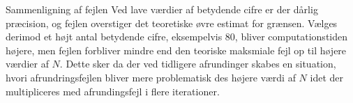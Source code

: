 
\begin{frame}{Sammenligning af fejlen}
    Ved lave værdier af betydende cifre er der dårlig præcision, og fejlen overstiger det teoretiske øvre estimat for grænsen. 
    Vælges derimod et højt antal betydende cifre, eksempelvis $80$, bliver computationstiden højere, men fejlen forbliver mindre end den teoriske maksmiale fejl op til højere værdier af $N$.
    Dette sker da der ved tidligere afrundinger skabes en situation, hvori afrundringsfejlen bliver mere problematisk des højere værdi af $N$ idet der multipliceres med afrundingsfejl i flere iterationer.
\end{frame}